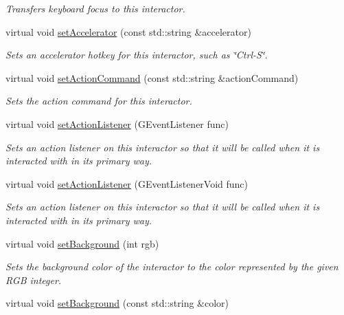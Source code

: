 \begin{DoxyCompactItemize}
\begin{DoxyCompactList}\small\item\em Transfers keyboard focus to this interactor. \end{DoxyCompactList}\item 
virtual void \mbox{\hyperlink{classGInteractor_ad15f102f62e2960576012f1aa0ba4b2e}{set\+Accelerator}} (const std\+::string \&accelerator)
\begin{DoxyCompactList}\small\item\em Sets an accelerator hotkey for this interactor, such as \char`\"{}\+Ctrl-\/\+S\char`\"{}. \end{DoxyCompactList}\item 
virtual void \mbox{\hyperlink{classGInteractor_a4b5843fe3030e038a1ba54cc03389bcf}{set\+Action\+Command}} (const std\+::string \&action\+Command)
\begin{DoxyCompactList}\small\item\em Sets the action command for this interactor. \end{DoxyCompactList}\item 
virtual void \mbox{\hyperlink{classGInteractor_adcfb4742430c88714fcf57e57ab8ea9c}{set\+Action\+Listener}} (G\+Event\+Listener func)
\begin{DoxyCompactList}\small\item\em Sets an action listener on this interactor so that it will be called when it is interacted with in its primary way. \end{DoxyCompactList}\item 
virtual void \mbox{\hyperlink{classGInteractor_aebd20a89c7a8a43a6fce999cf4f9fcf2}{set\+Action\+Listener}} (G\+Event\+Listener\+Void func)
\begin{DoxyCompactList}\small\item\em Sets an action listener on this interactor so that it will be called when it is interacted with in its primary way. \end{DoxyCompactList}\item 
virtual void \mbox{\hyperlink{classGInteractor_acba7e546c2025c0a15ca4b4cc92043db}{set\+Background}} (int rgb)
\begin{DoxyCompactList}\small\item\em Sets the background color of the interactor to the color represented by the given R\+GB integer. \end{DoxyCompactList}\item 
virtual void \mbox{\hyperlink{classGInteractor_ab4677ab2474e68b07aa56605af92a84a}{set\+Background}} (const std\+::string \&color)

\end{DoxyCompactItemize}

